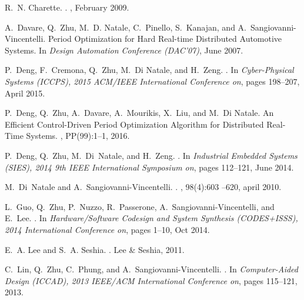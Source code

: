 \begin{thebibliography}{10}

R.~N. Charette.
.
, February 2009.

A.~Davare, Q.~Zhu, M.~D. Natale, C.~Pinello, S.~Kanajan, and
  A.~Sangiovanni-Vincentelli.
\newblock Period {O}ptimization for {H}ard {R}eal-time {D}istributed
  {A}utomotive {S}ystems.
\newblock In {\em Design Automation Conference (DAC'07)}, June 2007.

P.~Deng, F.~Cremona, Q.~Zhu, M.~{Di Natale}, and H.~Zeng.
.
\newblock In {\em Cyber-Physical Systems (ICCPS), 2015 ACM/IEEE International
  Conference on}, pages 198--207, April 2015.

P.~Deng, Q.~Zhu, A.~Davare, A.~Mourikis, X.~Liu, and M.~{Di Natale}.
\newblock An Efficient Control-Driven Period Optimization Algorithm for
  Distributed Real-Time Systems.
, PP(99):1--1, 2016.

P.~Deng, Q.~Zhu, M.~Di~Natale, and H.~Zeng.
.
\newblock In {\em Industrial Embedded Systems (SIES), 2014 9th IEEE
  International Symposium on}, pages 112--121, June 2014.

M.~Di~Natale and A.~Sangiovanni-Vincentelli.
.
, 98(4):603 --620, april 2010.

L.~Guo, Q.~Zhu, P.~Nuzzo, R.~Passerone, A.~Sangiovanni-Vincentelli, and E.~Lee.
.
\newblock In {\em Hardware/Software Codesign and System Synthesis (CODES+ISSS),
  2014 International Conference on}, pages 1--10, Oct 2014.

E.~A. Lee and S.~A. Seshia.
.
\newblock Lee \& Seshia, 2011.

C.~Lin, Q.~Zhu, C.~Phung, and A.~Sangiovanni-Vincentelli.
.
\newblock In {\em Computer-Aided Design (ICCAD), 2013 IEEE/ACM International
  Conference on}, pages 115--121, 2013.


\end{thebibliography}
